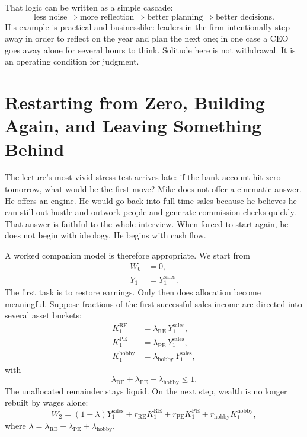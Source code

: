 That logic can be written as a simple cascade:
\begin{equation}
\text{less noise} \Longrightarrow \text{more reflection}
\Longrightarrow \text{better planning}
\Longrightarrow \text{better decisions}.
\end{equation}
His example is practical and businesslike: leaders in the firm intentionally step away in order to reflect on the year and plan the next one; in one case a CEO goes away alone for several hours to think. Solitude here is not withdrawal. It is an operating condition for judgment.

\section{Restarting from Zero, Building Again, and Leaving Something Behind}

The lecture's most vivid stress test arrives late: if the bank account hit zero tomorrow, what would be the first move? Mike does not offer a cinematic answer. He offers an engine. He would go back into full-time sales because he believes he can still out-hustle and outwork people and generate commission checks quickly. That answer is faithful to the whole interview. When forced to start again, he does not begin with ideology. He begins with cash flow.

A worked companion model is therefore appropriate. We start from
\begin{align}
W_0 &= 0,\\
Y_1 &= Y_1^{\text{sales}}.
\end{align}
The first task is to restore earnings. Only then does allocation become meaningful. Suppose fractions of the first successful sales income are directed into several asset buckets:
\begin{align}
K_1^{\text{RE}} &= \lambda_{\text{RE}}\,Y_1^{\text{sales}},\\
K_1^{\text{PE}} &= \lambda_{\text{PE}}\,Y_1^{\text{sales}},\\
K_1^{\text{hobby}} &= \lambda_{\text{hobby}}\,Y_1^{\text{sales}},
\end{align}
with
\begin{equation}
\lambda_{\text{RE}}+\lambda_{\text{PE}}+\lambda_{\text{hobby}}\le 1.
\end{equation}
The unallocated remainder stays liquid. On the next step, wealth is no longer rebuilt by wages alone:
\begin{equation}
W_2=(1-\lambda)Y_1^{\text{sales}}
+r_{\text{RE}}K_1^{\text{RE}}
+r_{\text{PE}}K_1^{\text{PE}}
+r_{\text{hobby}}K_1^{\text{hobby}},
\end{equation}
where \(\lambda=\lambda_{\text{RE}}+\lambda_{\text{PE}}+\lambda_{\text{hobby}}\).

